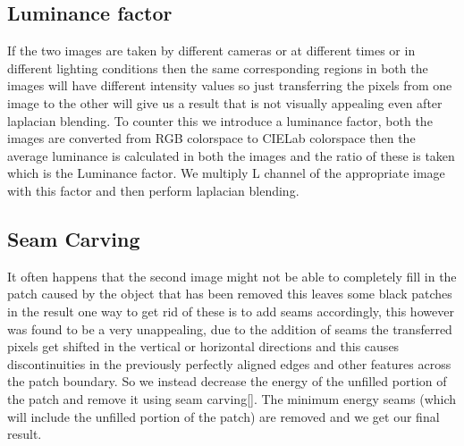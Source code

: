 \documentclass[conference]{IEEEtran}
\begin{document}
\subsection{Luminance factor}
	If the two images are taken by different cameras or at different times or in different lighting conditions then the same corresponding regions in both the images will have different intensity values so just transferring the pixels from one image to the other will give us a result that is not visually appealing even after laplacian blending. To counter this we introduce a luminance factor, both the images are converted from RGB colorspace to CIELab colorspace then the average luminance is calculated in both the images and the ratio of these is taken which is the Luminance factor. We multiply L channel of the appropriate image with this factor and then perform laplacian blending. 

\subsection{Seam Carving}
	It often happens that the second image might not be able to completely fill in the patch caused by the object that has been removed this leaves some black patches in the result one way to get rid of these is to add seams accordingly, this however was found to be a very unappealing, due to the addition of seams the transferred pixels get shifted in the vertical or horizontal directions and this causes discontinuities in the previously perfectly aligned edges and other features across the patch boundary. So we instead decrease the energy of the unfilled portion of the patch and remove it using seam carving[\cite{avidan2007seam}]. The minimum energy seams (which will include the unfilled portion of the patch) are removed and
we get our final result.
\end{document}
